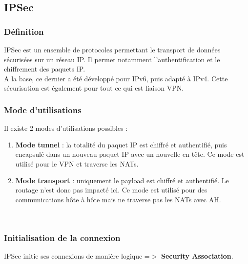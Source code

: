 \documentclass{report}
\begin{document}
\subsection{IPSec}

\subsubsection{Définition}

    IPSec est un ensemble de protocoles permettant le transport de données sécurisées sur un réseau IP. Il permet notamment l'authentification et le chiffrement des paquets IP. \\ A la base, ce dernier a été développé pour IPv6, puis adapté à IPv4. Cette sécurisation est également pour tout ce qui est liaison VPN.\\

\subsubsection{Mode d'utilisations}
    Il existe 2 modes d'utilisations possibles :
    \begin{enumerate}
        \item \textbf{Mode tunnel} : la totalité du paquet IP est chiffré et authentifié, puis encapsulé dans un nouveau paquet IP avec un nouvelle en-tête. Ce mode est utilisé pour le VPN et traverse les NATs.
        \item \textbf{Mode transport} : uniquement le payload est chiffré et authentifié. Le routage n'est donc pas impacté ici. Ce mode est utilisé pour des communications hôte à hôte mais ne traverse pas les NATs avec AH.
    \end{enumerate}~

\subsubsection{Initialisation de la connexion}

    IPSec initie ses connexions de manière logique =$>$ \textbf{Security Association}.
\end{document}
